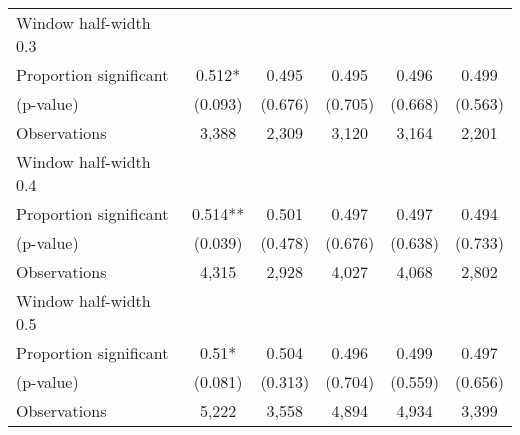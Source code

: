 \begin{tabular}{l*{5}{c}}
\hline
Window half-width 0.3\\

Proportion significant& 0.512* &  0.495 &  0.495 &  0.496 &  0.499\\

(p-value) & (0.093) &  (0.676) &  (0.705) &  (0.668) &  (0.563)\\

Observations& 3,388 &  2,309 &  3,120 &  3,164 &  2,201\\

\hline
Window half-width 0.4\\

Proportion significant& 0.514** &  0.501 &  0.497 &  0.497 &  0.494\\

(p-value) & (0.039) &  (0.478) &  (0.676) &  (0.638) &  (0.733)\\

Observations& 4,315 &  2,928 &  4,027 &  4,068 &  2,802\\

\hline
Window half-width 0.5\\

Proportion significant& 0.51* &  0.504 &  0.496 &  0.499 &  0.497\\

(p-value) & (0.081) &  (0.313) &  (0.704) &  (0.559) &  (0.656)\\

Observations& 5,222 &  3,558 &  4,894 &  4,934 &  3,399\\

\hline\hline
\end{tabular}

